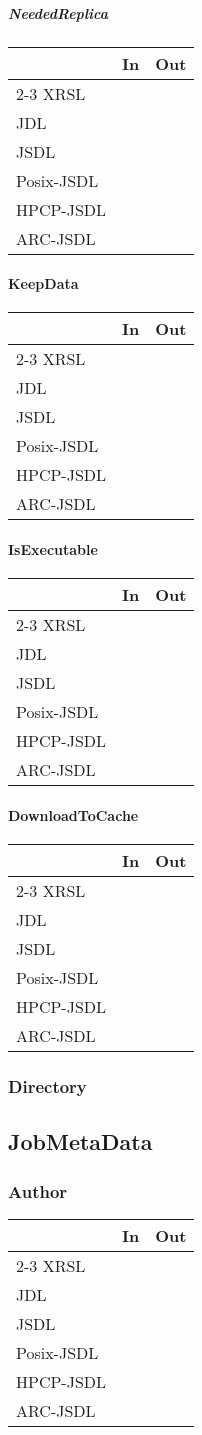 \documentclass{article}
\newcommand{\subsubsubsection}[1]{\paragraph{#1}}
\newcommand{\subsubsubsubsection}[1]{\subparagraph{#1}}
\newenvironment{inouttabular}%
{\begin{center}\begin{tabular}{l>{\ttfamily\footnotesize}c>{\ttfamily\footnotesize}c}%
\toprule
& \textnormal{\normalsize{In}} & \textnormal{\normalsize{Out}}\\ \cmidrule{2-3}}
{\bottomrule\end{tabular}\end{center}}
\begin{document}
\subsubsubsubsection{NeededReplica}
\begin{inouttabular}
XRSL & &\\
JDL & &\\
JSDL & &\\
Posix-JSDL & &\\
HPCP-JSDL & &\\
ARC-JSDL & &\\
\end{inouttabular}

\subsubsubsection{KeepData}
\begin{inouttabular}
XRSL & &\\
JDL & &\\
JSDL & &\\
Posix-JSDL & &\\
HPCP-JSDL & &\\
ARC-JSDL & &\\
\end{inouttabular}

\subsubsubsection{IsExecutable}
\begin{inouttabular}
XRSL & &\\
JDL & &\\
JSDL & &\\
Posix-JSDL & &\\
HPCP-JSDL & &\\
ARC-JSDL & &\\
\end{inouttabular}

\subsubsubsection{DownloadToCache}
\begin{inouttabular}
XRSL & &\\
JDL & &\\
JSDL & &\\
Posix-JSDL & &\\
HPCP-JSDL & &\\
ARC-JSDL & &\\
\end{inouttabular}

\subsubsection{Directory}

\subsection{JobMetaData}
\subsubsection{Author}
\begin{inouttabular}
XRSL & &\\
JDL & &\\
JSDL & &\\
Posix-JSDL & &\\
HPCP-JSDL & &\\
ARC-JSDL & &\\
\end{inouttabular}
\end{document}
